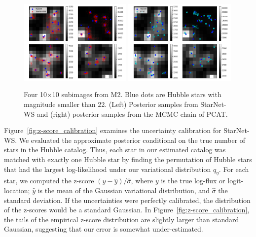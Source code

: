 \begin{figure}[H]
    \centering
    \includegraphics[width=0.49\textwidth]{figures/example_subimages_samples_ws.png}
    \includegraphics[width=0.49\textwidth]{figures/example_subimages_samples_pcat.png}
    \caption{Four 10$\times$10 subimages from
    M2. Blue dots are Hubble stars with magnitude smaller than 22. (Left) Posterior samples from StarNet-WS and (right) posterior samples from the MCMC chain of PCAT. }
    \label{fig:example_subimages_sampled}
\end{figure}

Figure~\ref{fig:z-score_calibration} examines the uncertainty calibration for StarNet-WS. 
We evaluated the approximate posterior 
conditional on the true number of stars in the Hubble catalog. 
Thus, each star in our estimated catalog was matched with exactly one Hubble star by finding the permutation of Hubble stars that had the largest log-likelihood under our variational distribution $q_\eta$. 
For each star, we computed the z-score $(y - \hat y) / \hat \sigma$, where $y$ is the true log-flux or 
logit-location; $\hat y$ is the mean of the Gaussian variational distribution, and $\hat\sigma$ the standard deviation.
If the uncertainties were perfectly calibrated, the distribution of the z-scores would be a standard Gaussian. 
In Figure~\ref{fig:z-score_calibration}, the tails of the empirical z-score distribution are slightly larger than standard Gaussian, suggesting that our error is somewhat under-estimated. 

